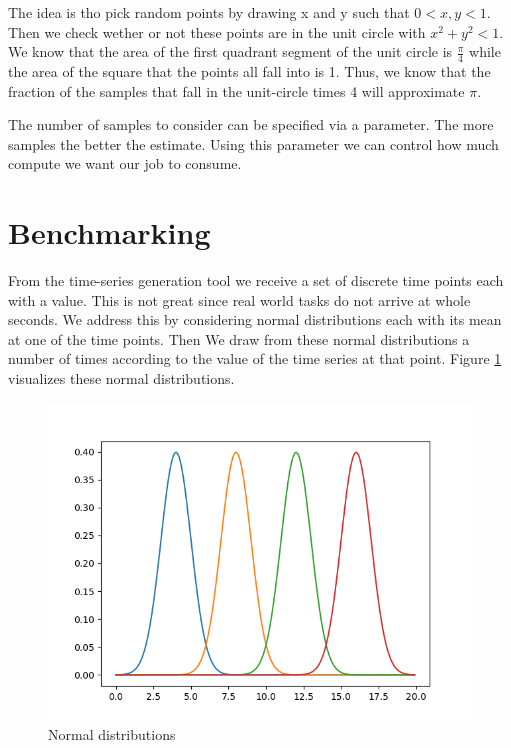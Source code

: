The idea is tho pick random points by drawing x and y such that $0 < x, y < 1$. Then we check wether or not these points are in the unit circle with $x^2 + y^2 < 1$. We know that the area of the first quadrant segment of the unit circle is $\frac{\pi}{4}$ while the area of the square that the points all fall into is 1. Thus, we know that the fraction of the samples that fall in the unit-circle times 4 will approximate $\pi$.

The number of samples to consider can be specified via a parameter. The more samples the better the estimate. Using this parameter we can control how much compute we want our job to consume. 

\section{Benchmarking}

From the time-series generation tool we receive a set of discrete time points each with a value. This is not great since real world tasks do not arrive at whole seconds. We address this by considering normal distributions each with its mean at one of the time points. Then We draw from these normal distributions a number of times according to the value of the time series at that point. Figure \ref{fig:normal-dists} visualizes these normal distributions.

\begin{figure}
   \centering
   \includegraphics[scale=0.70]{figures/normal-dists.png}
\caption{Normal distributions}    
\label{fig:normal-dists}
\end{figure}


